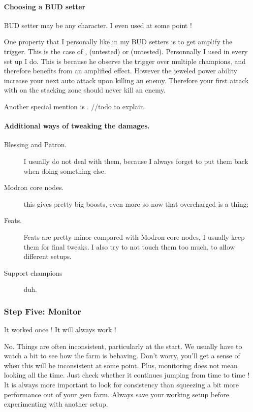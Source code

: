\documentclass{article}
\begin{document}
\paragraph{Choosing a BUD setter}
BUD setter may be any character.
I even used \nerys at some point !

One property that I personally like in my BUD setters is to get amplify the trigger.
This is the case of \artemis, \arkhan (untested) or \blackViper (untested).
Personnally I used \artemis in every set up I do.
This is because he observe the trigger over multiple champions, and therefore benefits from an amplified effect.
However the jeweled power ability increase your next auto attack upon killing an enemy.
Therefore your first attack with \artemis on the stacking zone should never kill an enemy.

Another special mention is \nahara.
//todo to explain

\paragraph{Additional ways of tweaking the damages.}

\begin{description}
    \item[Blessing and Patron.] I usually do not deal with them, because I always forget to put them back when doing something else.
    \item[Modron core nodes.] this gives pretty big boosts, even more so now that overcharged is a thing;
    \item[Feats.] Feats are pretty minor compared with Modron core nodes, I usually keep them for final tweaks.
    I also try to not touch them too much, to allow different setups.
    \item[Support champions] duh.
\end{description}


\subsubsection{Step Five: Monitor}
\label{sec:stepFive}

It worked once !\newline
It will always work !\newline

No.\newline
Things are often inconsistent, particularly at the start.
We usually have to watch a bit to see how the farm is behaving.
Don't worry, you'll get a sense of when this will be inconsistent at some point.
Plus, monitoring does not mean looking all the time.
Just check whether it continues jumping from time to time !
It is always more important to look for consistency than squeezing a bit more performance out of your gem farm.
Always save your working setup before experimenting with another setup.
\end{document}
